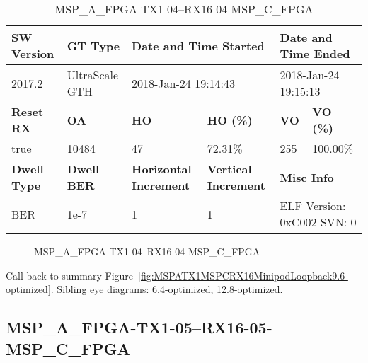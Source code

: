\begin{table}[h]
\centering
\caption{MSP\_A\_FPGA-TX1-04--RX16-04-MSP\_C\_FPGA}
\label{tab:MSPAFPGATX104RX1604MSPCFPGA9.6-optimized}
\begin{tabular}{@{}|l|l|l|l|l|l|@{}}
\toprule
\textbf{SW Version}                & \textbf{GT Type}   & \multicolumn{2}{l|}{\textbf{Date and Time Started}}            & \multicolumn{2}{l|}{\textbf{Date and Time Ended}}        \\ \midrule
2017.2                       & UltraScale GTH          & \multicolumn{2}{l|}{2018-Jan-24 19:14:43}                   & \multicolumn{2}{l|}{2018-Jan-24 19:15:13}               \\ \midrule
\textbf{Reset RX}                  & \textbf{OA} & \textbf{HO}   & \textbf{HO (\%)} & \textbf{VO} & \textbf{VO (\%)} \\ \midrule
true & 10484        & 47          & 72.31\%        & 255        & 100.00\%       \\ \midrule
\textbf{Dwell Type}                & \textbf{Dwell BER} & \textbf{Horizontal Increment} & \textbf{Vertical Increment}    & \multicolumn{2}{l|}{\textbf{Misc Info}}                  \\ \midrule
BER                            & 1e-7        & 1        & 1           & \multicolumn{2}{l|}{ELF Version: 0xC002 SVN: 0}                         \\ \bottomrule
\end{tabular}
\end{table}

\begin{figure}[h]
\caption{MSP\_A\_FPGA-TX1-04--RX16-04-MSP\_C\_FPGA} \label{fig:MSPAFPGATX104RX1604MSPCFPGA9.6-optimized}
\end{figure}

Call back to summary Figure~\ref{fig:MSPATX1MSPCRX16MinipodLoopback9.6-optimized}.
Sibling eye diagrams: \hyperref[sec:MSPAFPGATX104RX1604MSPCFPGA6.4-optimized]{6.4-optimized}, \hyperref[sec:MSPAFPGATX104RX1604MSPCFPGA12.8-optimized]{12.8-optimized}.

\clearpage
\newpage


\subsection{MSP\_A\_FPGA-TX1-05--RX16-05-MSP\_C\_FPGA}\label{sec:MSPAFPGATX105RX1605MSPCFPGA9.6-optimized}

